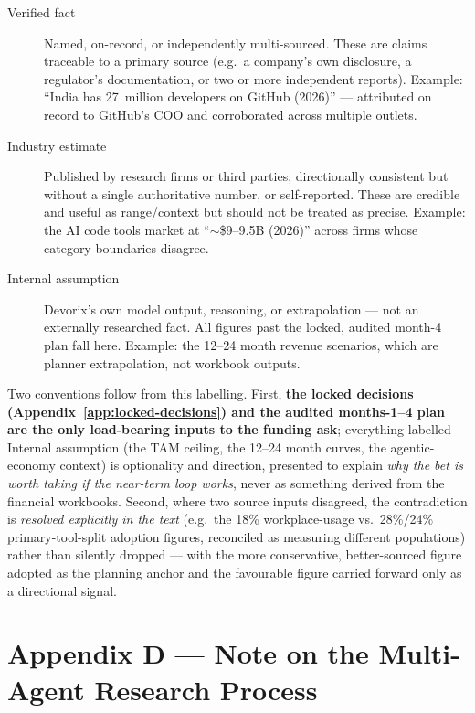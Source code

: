 \begin{description}
  \item[Verified fact] Named, on-record, or independently multi-sourced. These
        are claims traceable to a primary source (e.g.\ a company's own
        disclosure, a regulator's documentation, or two or more independent
        reports). Example: ``India has 27~million developers on GitHub (2026)''
        --- attributed on record to GitHub's COO and corroborated across
        multiple outlets.

  \item[Industry estimate] Published by research firms or third parties,
        directionally consistent but without a single authoritative number, or
        self-reported. These are credible and useful as range/context but should
        not be treated as precise. Example: the AI code tools market at
        ``$\sim$\$9--9.5B (2026)'' across firms whose category boundaries
        disagree.

  \item[Internal assumption] Devorix's own model output, reasoning, or
        extrapolation --- not an externally researched fact. All figures past
        the locked, audited month-4 plan fall here. Example: the 12--24 month
        revenue scenarios, which are planner extrapolation, not workbook
        outputs.
\end{description}

Two conventions follow from this labelling. First, \textbf{the locked decisions
(Appendix~\ref{app:locked-decisions}) and the audited months-1--4 plan are the
only load-bearing inputs to the funding ask}; everything labelled Internal
assumption (the TAM ceiling, the 12--24 month curves, the agentic-economy
context) is optionality and direction, presented to explain \emph{why the bet
is worth taking if the near-term loop works}, never as something derived from
the financial workbooks. Second, where two source inputs disagreed, the
contradiction is \emph{resolved explicitly in the text} (e.g.\ the 18\%
workplace-usage vs.\ 28\%/24\% primary-tool-split adoption figures, reconciled
as measuring different populations) rather than silently dropped --- with the
more conservative, better-sourced figure adopted as the planning anchor and the
favourable figure carried forward only as a directional signal.

\section{Appendix D --- Note on the Multi-Agent Research Process}
\label{app:research-process}

